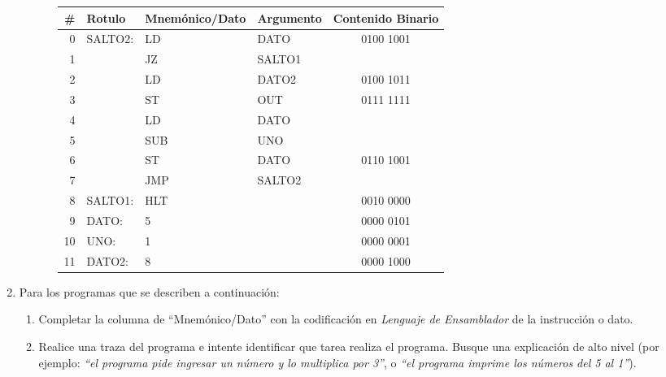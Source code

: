 \documentclass[12pt]{article}
\begin{document}
\begin{enumerate}
\begin{enumerate}
\begin{enumerate}
\begin{tabular}{|r||l|l|l||c|}
                    \hline

                    \textbf{\#} & \textbf{Rotulo} & \textbf{Mnemónico/Dato} &
                    \textbf{Argumento} & \textbf{Contenido Binario}\\
                    \hline
                    \hline

                    0 & SALTO2: & LD & DATO & 0100 1001\\ \hline
                    1 & & JZ & SALTO1 & \\ \hline
                    2 & & LD & DATO2 & 0100 1011\\ \hline
                    3 & & ST & OUT & 0111 1111\\ \hline
                    4 & & LD & DATO & \\ \hline
                    5 & & SUB & UNO & \\ \hline
                    6 & & ST & DATO & 0110 1001\\ \hline
                    7 & & JMP & SALTO2 & \\ \hline
                    8 & SALTO1: & HLT & & 0010 0000\\ \hline
                    9 & DATO: & 5 & & 0000 0101\\ \hline
                    10 & UNO: & 1 & & 0000 0001\\ \hline
                    11 & DATO2: & 8 & & 0000 1000\\ \hline

                \end{tabular}

            \end{enumerate}
        \end{enumerate}

    \item Para los programas que se describen a continuación:

        \begin{enumerate}

            \item Completar la columna de ``Mnemónico/Dato'' con la
                codificación en \emph{Lenguaje de Ensamblador} de la
                instrucción o dato.

            \item Realice una traza del programa e intente identificar que
                tarea realiza el programa. Busque una explicación de alto
                nivel (por ejemplo: \emph{``el programa pide ingresar un
                número y lo multiplica por 3''}, o \emph{``el programa imprime
                los números del 5 al 1''}).


\end{enumerate}
\end{enumerate}
\end{document}
